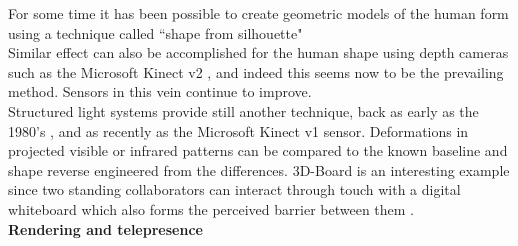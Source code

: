                 For some time it has been possible to create geometric models of the human form using a technique called ``shape from silhouette" \cite{Allard2006, Petit:2008tva,Matusik2000,Starck2008,Franco2003,Baumgart1975,Laurentini1994a,Grau2007,Waizenegger2011,Franco2009,Feldmann2009,Cooke2000, Starck2003}\\
                Similar effect can also be accomplished for the human shape using depth cameras such as the Microsoft Kinect v2 \cite{Maimone2011}, and indeed this seems now to be the prevailing method. Sensors in this vein continue to improve.\\
       Structured light systems provide still another technique, back as early as the 1980's \cite{Hu:1986ww}, and as recently as the Microsoft Kinect v1 sensor. Deformations in projected visible or infrared patterns can be compared to the known baseline and shape reverse engineered from the differences. 3D-Board is an interesting example since two standing collaborators can interact through touch with a digital whiteboard which also forms the perceived barrier between them \cite{Zillner2014}.\\
       \textbf{Rendering and telepresence}
       
